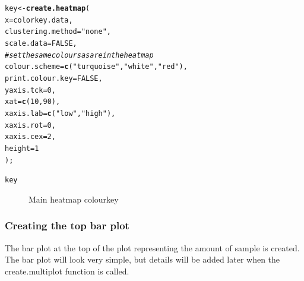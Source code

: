\documentclass[letterpaper]{article}\usepackage[]{graphicx}\usepackage[]{color}
\makeatletter
\newcommand{\hlnum}[1]{\textcolor[rgb]{0.686,0.059,0.569}{#1}}%
\newcommand{\hlstr}[1]{\textcolor[rgb]{0.192,0.494,0.8}{#1}}%
\newcommand{\hlcom}[1]{\textcolor[rgb]{0.678,0.584,0.686}{\textit{#1}}}%
\newcommand{\hlstd}[1]{\textcolor[rgb]{0.345,0.345,0.345}{#1}}%
\newcommand{\hlkwb}[1]{\textcolor[rgb]{0.69,0.353,0.396}{#1}}%
\newcommand{\hlkwc}[1]{\textcolor[rgb]{0.333,0.667,0.333}{#1}}%
\newcommand{\hlkwd}[1]{\textcolor[rgb]{0.737,0.353,0.396}{\textbf{#1}}}%
\newenvironment{kframe}{%
 \def\at@end@of@kframe{}%
 \ifinner\ifhmode%
  \def\at@end@of@kframe{\end{minipage}}%
  \begin{minipage}{\columnwidth}%
 \fi\fi%
 \def\FrameCommand##1{\hskip\@totalleftmargin \hskip-\fboxsep
 \colorbox{shadecolor}{##1}\hskip-\fboxsep
     \hskip-\linewidth \hskip-\@totalleftmargin \hskip\columnwidth}%
 \MakeFramed {\advance\hsize-\width
   \@totalleftmargin\z@ \linewidth\hsize
   \@setminipage}}%
 {\par\unskip\endMakeFramed%
 \at@end@of@kframe}
\newenvironment{knitrout}{}{} %
\makeatother
\begin{document}
\begin{knitrout}
\color{fgcolor}\begin{kframe}
\begin{alltt}
\hlstd{key} \hlkwb{<-} \hlkwd{create.heatmap}\hlstd{(}
   \hlkwc{x} \hlstd{= colorkey.data,}
   \hlkwc{clustering.method} \hlstd{=} \hlstr{"none"}\hlstd{,}
   \hlkwc{scale.data} \hlstd{=} \hlnum{FALSE}\hlstd{,}
   \hlcom{# set the same colours as are in the heatmap}
   \hlkwc{colour.scheme} \hlstd{=} \hlkwd{c}\hlstd{(}\hlstr{"turquoise"}\hlstd{,} \hlstr{"white"}\hlstd{,} \hlstr{"red"}\hlstd{),}
   \hlkwc{print.colour.key} \hlstd{=} \hlnum{FALSE}\hlstd{,}
   \hlkwc{yaxis.tck} \hlstd{=} \hlnum{0}\hlstd{,}
   \hlkwc{xat} \hlstd{=} \hlkwd{c}\hlstd{(}\hlnum{10}\hlstd{,} \hlnum{90}\hlstd{),}
   \hlkwc{xaxis.lab} \hlstd{=} \hlkwd{c}\hlstd{(}\hlstr{"low"}\hlstd{,} \hlstr{"high"}\hlstd{),}
   \hlkwc{xaxis.rot} \hlstd{=} \hlnum{0}\hlstd{,}
   \hlkwc{xaxis.cex} \hlstd{=} \hlnum{2}\hlstd{,}
   \hlkwc{height} \hlstd{=} \hlnum{1}
   \hlstd{);}

\hlstd{key}
\end{alltt}
\end{kframe}\begin{figure}[]


{\centering {} 

}

\caption[Main heatmap colourkey]{Main heatmap colourkey\label{fig:multiplotex2_colourkey}}
\end{figure}


\end{knitrout}

\subsubsection{Creating the top bar plot}
The bar plot at the top of the plot representing the amount of sample is created. The bar plot will look very simple, but details will be added later when the create.multiplot function is called.
\end{document}
